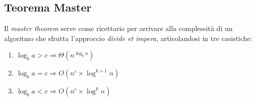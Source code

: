 \subsection{Teorema Master}
Il \textit{master theorem} serve come ricettario per arrivare alla complessità di un algoritmo che sfrutta l'approccio \textit{divide et impera}, articolandosi in tre casistiche:
\begin{enumerate}
	\item $\log_{b}{a} > c \Rightarrow \Theta(n^{\log_{b}{a}})$
	\item $\log_{b}{a} = c \Rightarrow O(n^c\times \log^{k+1}{n})$
	\item $\log_{b}{a} < c \Rightarrow O(n^c\times \log^k{n})$
\end{enumerate}

